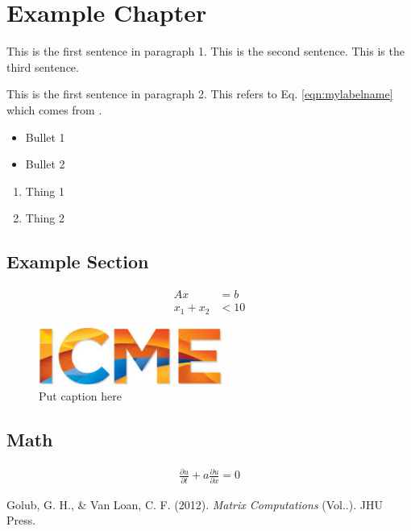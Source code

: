 \documentclass{report}
\newcommand{\pder}[2]{\frac{\partial {#1}}{\partial {#2}}}
\begin{document}
\chapter{Example Chapter}
This is the first sentence in paragraph 1. This is the second sentence.
This is the third sentence.

This is the first sentence in paragraph 2.
This refers to Eq. \ref{eqn:mylabelname} which comes from \cite{golub}.

\begin{itemize}
   \item Bullet 1
   \item Bullet 2
\end{itemize}

\begin{enumerate}
   \item Thing 1
   \item Thing 2
\end{enumerate}

\section{Example Section}
\begin{align} %
   Ax &= b  \\
   x_1 + x_2 &< 10 \label{eqn:mylabelname}
\end{align}

\begin{figure}
    \centering
    \includegraphics[width=6cm]{icme.jpeg}
    \caption{Put caption here}
    \label{fig:myFig}
\end{figure}

\section{Math}
\begin{align}
	\pder{u}{t} + a\pder{u}{x} = 0
\end{align}



\begin{thebibliography}{1}
Golub, G. H., \&  Van Loan, C. F. (2012). \textit{Matrix Computations} (Vol..). JHU Press.
\end{thebibliography}
\end{document}
